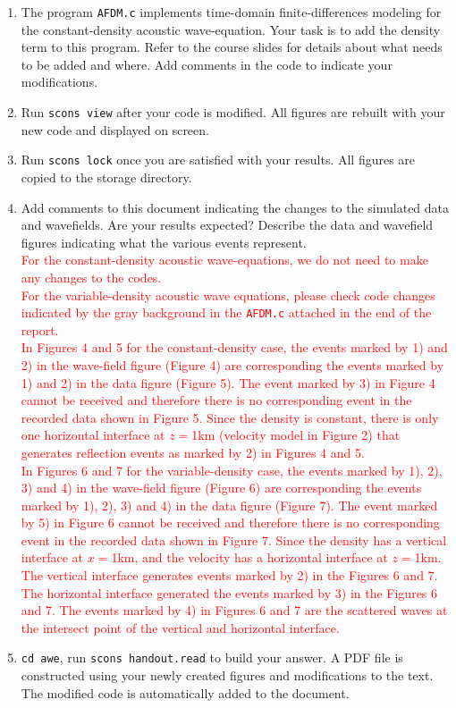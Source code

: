 \begin{enumerate}
\item The program \texttt{AFDM.c} implements time-domain
  finite-differences modeling for the constant-density acoustic
  wave-equation. Your task is to add the density term to this
  program. Refer to the course slides for details about what needs to
  be added and where. Add comments in the code to indicate your
  modifications.

\item Run \texttt{scons view} after your code is modified. All figures
  are rebuilt with your new code and displayed on screen.

\item Run \texttt{scons lock} once you are satisfied with your
  results. All figures are copied to the storage directory.

\item Add comments to this document indicating the changes to the
  simulated data and wavefields. Are your results expected? Describe
  the data and wavefield figures indicating what the various events
  represent.\\
  \textcolor{red}{
  For the constant-density acoustic wave-equations, we do not need to make any
  changes to the codes.\\
  For the variable-density acoustic wave equations, please check code changes
  indicated by the gray background in the \texttt{AFDM.c} attached in the end of
  the report.\\
  In Figures 4 and 5 for the constant-density case, the events marked by 1) and 2) 
  in the wave-field figure (Figure 4) are corresponding the events marked 
  by 1) and 2) in the data figure (Figure 5). The event marked by 3) in Figure 4 
  cannot be received and therefore there is no corresponding event in the 
  recorded data shown in Figure 5. Since the density is constant, there is only
  one horizontal interface at $z=$1km (velocity model in Figure 2) that generates 
  reflection events as marked by 2) in Figures 4 and 5.\\
  In Figures 6 and 7 for the variable-density case, the events marked by 1), 2),
  3) and 4) in the wave-field figure (Figure 6) are corresponding the events marked 
  by 1), 2), 3) and 4) in the data figure (Figure 7). The event marked by 5) in Figure 6 
  cannot be received and therefore there is no corresponding event in the 
  recorded data shown in Figure 7. Since the density has a vertical interface at
  $x=$1km, and the velocity has a horizontal interface at $z=$1km. The vertical
  interface generates events marked by 2) in the Figures 6 and 7. The horizontal
  interface generated the events marked by 3) in the Figures 6 and 7. The
  events marked by 4) in Figures 6 and 7 are the scattered waves at the
  intersect point of the vertical and horizontal interface.
  }

\item \texttt{cd awe}, run \texttt{scons handout.read} to build your
  answer. A PDF file is constructed using your newly created figures
  and modifications to the text. The modified code is automatically
  added to the document.

\end{enumerate}

